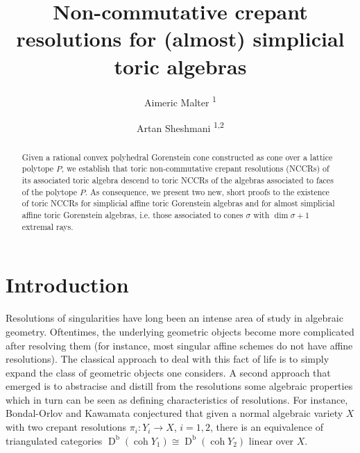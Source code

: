 \documentclass[reqno, 12pt]{amsart}
\title[NCCRs for (almost) simplicial toric algebras]{Non-commutative crepant resolutions for (almost) simplicial toric algebras}
\author{Aimeric Malter \textsuperscript{1}}
\author{Artan Sheshmani \textsuperscript{1,2}}
\theoremstyle{definition}
\numberwithin{equation}{section}
\newcommand{\dbcoh}[1]{\operatorname{D}^{\operatorname{b}}(\operatorname{coh }#1)}
\begin{document}
\begin{abstract}
Given a rational convex polyhedral Gorenstein cone constructed as cone over a lattice polytope $P$, we establish that toric non-commutative crepant resolutions (NCCRs) of its associated toric algebra descend to toric NCCRs of the algebras associated to faces of the polytope $P$. As consequence, we present two new, short proofs to the existence of toric NCCRs for simplicial affine toric Gorenstein algebras and for almost simplicial affine toric Gorenstein algebras, i.e. those associated to cones $\sigma$ with $\dim\sigma+1$ extremal rays. 
\end{abstract}
\maketitle
\section{Introduction}\label{Sec:Intro}

Resolutions of singularities have long been an intense area of study in algebraic geometry. Oftentimes, the underlying geometric objects become more complicated after resolving them (for instance, most singular affine schemes do not have affine resolutions). The classical approach to deal with this fact of life is to simply expand the class of geometric objects one considers. A second approach that emerged is to abstracise and distill from the resolutions some algebraic properties which in turn can be seen as defining characteristics of resolutions. For instance, Bondal-Orlov \cite{BO02} and Kawamata \cite{Kaw02} conjectured that given a normal algebraic variety $X$ with two crepant resolutions $\pi_i:Y_i\rightarrow X$, $i=1,2$, there is an equivalence of triangulated categories $\dbcoh{Y_1}\cong \dbcoh{Y_2}$ linear over $X$.
\end{document}

